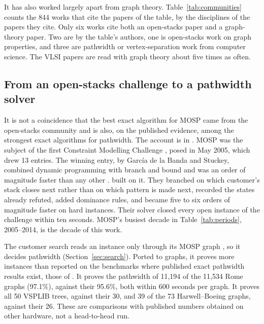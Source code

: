 \begin{table}[t]
\centering\small
\caption{The open-stacks papers are read apart from graph theory. Works citing
the papers that the Linhares--Yanasse table cites, by the discipline of the
papers they cite. Of 135 works citing an operations-research paper, 6 also cite
a graph-theory paper (4\%); of 285 citing a VLSI paper, 65 do (23\%). The 2002
paper itself counts as operations research. OpenAlex, 29 September 2026; 844
citing works in all.}
\label{tab:communities}

\end{table}

It has also worked largely apart from graph theory. Table~\ref{tab:communities}
counts the 844 works that cite the papers of the table, by the disciplines of
the papers they cite. Only six works cite both an open-stacks paper and a
graph-theory paper. Two are by the table's authors, one is open-stacks work on
graph properties, and three are pathwidth or vertex-separation work from
computer science. The VLSI papers are read with graph theory about five times as
often.

\subsection{From an open-stacks challenge to a pathwidth solver}

It is not a coincidence that the best exact algorithm for MOSP came from the
open-stacks community and is also, on the published evidence, among the
strongest exact algorithms for pathwidth. The account is
in \citet[\S1]{ChuStuckey2009}. MOSP was the subject of the first Constraint
Modelling Challenge \citep{SmithGent2005}, posed in May 2005, which drew 13
entries. The winning entry, by García de la Banda and Stuckey, combined dynamic
programming with branch and bound and was an order of magnitude faster than
any other \citep{GarciaDeLaBandaStuckey2007}. \citet{ChuStuckey2009} built on
it. They branched on which customer's stack closes next rather than on which
pattern is made next, recorded the states already refuted, added dominance
rules, and became
five to six orders of magnitude faster on hard instances. Their solver closed
every open instance of the challenge within ten seconds. MOSP's busiest decade
in Table~\ref{tab:periods}, 2005--2014, is the decade of this work.

The customer search reads an instance only through its MOSP graph
\citep[p.~4]{ChuStuckey2009}, so it decides pathwidth
(Section~\ref{sec:search}). Ported to graphs, it proves more instances than
reported on the benchmarks where published exact pathwidth results exist, those
of \citet{CoudertMazauricNisse2016}. It proves the pathwidth of 11,194 of the
11,534 Rome graphs (97.1\%), against their 95.6\%, both within 600 seconds per
graph. It proves all 50 VSPLIB trees, against their 30, and 39 of the 73
Harwell--Boeing graphs, against their 26. These are comparisons with published
numbers obtained on other hardware, not a head-to-head run.

